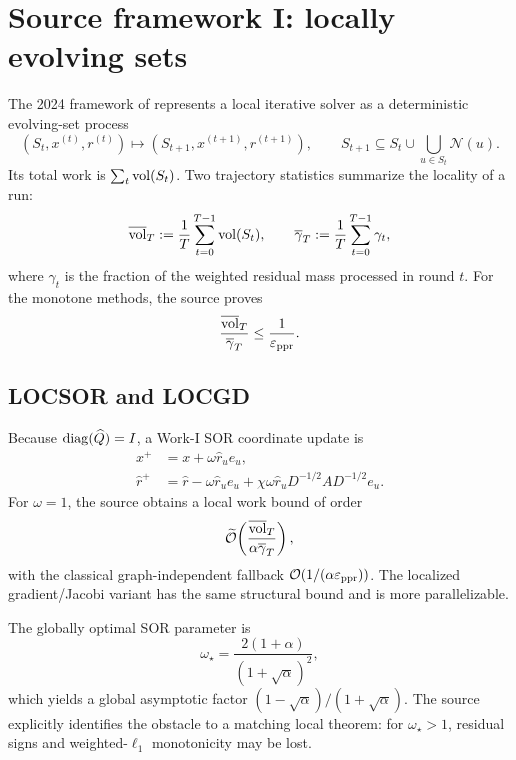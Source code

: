 \section{Source framework I: locally evolving sets}
\label{sec:work1}

The 2024 framework of \citet{zhou2024iterative} represents a local iterative
solver as a deterministic evolving-set process
\[
  (S_t,x^{(t)},r^{(t)})
  \longmapsto
  (S_{t+1},x^{(t+1)},r^{(t+1)}),
  \qquad
  S_{t+1}\subseteq S_t\cup\bigcup_{u\in S_t}\mathcal N(u).
\]
Its total work is $\sum_t\operatorname{vol}(S_t)$.  Two trajectory statistics summarize the
locality of a run:
\begin{equation}
  \overline{\operatorname{vol}}_T
  :=\frac1T\sum_{t=0}^{T-1}\operatorname{vol}(S_t),
  \qquad
  \overline\gamma_T
  :=\frac1T\sum_{t=0}^{T-1}\gamma_t,
  \label{eq:work1-trajectory}
\end{equation}
where $\gamma_t$ is the fraction of the weighted residual mass processed in
round $t$.  For the monotone methods, the source proves
\begin{equation}
  \frac{\overline{\operatorname{vol}}_T}{\overline\gamma_T}\leq\frac1{\varepsilon_{\mathrm{ppr}}}.
  \label{eq:work1-locality}
\end{equation}

\subsection{LOCSOR and LOCGD}

Because $\operatorname{diag}(\widehat Q)=I$, a Work-I SOR coordinate update is
\begin{align}
  x^+&=x+\omega\widehat r_u e_u,
  \label{eq:work1-sor-x}\\
  \widehat r^+&=\widehat r-\omega\widehat r_u e_u
    +\chi\omega\widehat r_u D^{-1/2}AD^{-1/2}e_u.
  \label{eq:work1-sor-r}
\end{align}
For $\omega=1$, the source obtains a local work bound of order
\begin{equation}
  \widetilde{\mathcal{O}}\!\left(
    \frac{\overline{\operatorname{vol}}_T}{\alpha\overline\gamma_T}
  \right),
  \label{eq:locsor-source-bound}
\end{equation}
with the classical graph-independent fallback $\mathcal{O}(1/(\alpha\varepsilon_{\mathrm{ppr}}))$.
The localized gradient/Jacobi variant has the same structural bound and is
more parallelizable.

The globally optimal SOR parameter is
\begin{equation}
  \omega_\star
  =\frac{2(1+\alpha)}{(1+\sqrt\alpha)^2},
  \label{eq:omega-star}
\end{equation}
which yields a global asymptotic factor
$(1-\sqrt\alpha)/(1+\sqrt\alpha)$.  The source explicitly identifies the
obstacle to a matching local theorem: for $\omega_\star>1$, residual signs and
weighted-$\ell_1$ monotonicity may be lost.

